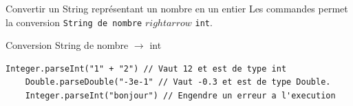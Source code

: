 \documentclass{report}
\begin{document}
\begin{Syntaxe*}{Convertir un String représentant un nombre en un entier}{}
Les commandes  permet la conversion \texttt{\footnotesize{String de nombre}} $rightarrow$ \texttt{\footnotesize{int}}.
\end{Syntaxe*}

\begin{EExample*}{Conversion String de nombre $\rightarrow$ int}{}
\begin{lstlisting}[style=JavaDraculaWhite]
	Integer.parseInt("1" + "2") // Vaut 12 et est de type int
	Double.parseDouble("-3e-1" // Vaut -0.3 et est de type Double.
	Integer.parseInt("bonjour") // Engendre un erreur a l'execution
\end{lstlisting}
\end{EExample*}
\end{document}
